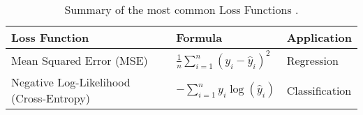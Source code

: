 \begin{table}[htb!]
\centering
\footnotesize
\begin{tabularx}{\textwidth}{@{}lXl@{}}
\toprule
\textbf{Loss Function} & \textbf{Formula} & \textbf{Application} \\
\midrule
Mean Squared Error (MSE) & \( \frac{1}{n} \sum_{i=1}^n (y_i - \hat{y}_i)^2 \) & Regression \\
\addlinespace
Negative Log-Likelihood (Cross-Entropy) & \( -\sum_{i=1}^n y_i \log(\hat{y}_i) \) & Classification \\
\bottomrule
\end{tabularx}
\caption{Summary of the most common Loss Functions \cite{goodfellow_deep_2016}.}
\label{Tables:LossFunctions}
\end{table}
